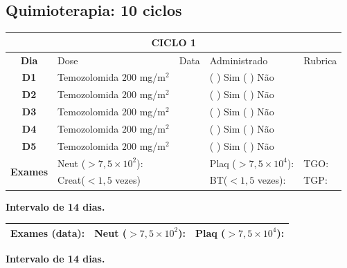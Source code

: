 \documentclass[11pt,a4paper,oldfontcommands]{memoir}
\begin{document}
\subsection{Quimioterapia: 10 ciclos}
\begin{center}
\begin{longtable}{p{1cm}p{4cm}|p{1cm}|p{4.6cm}|p{3cm}}
	\hline
	\multicolumn{5}{c}{\textbf{CICLO 1}}\\
\hline
    \multicolumn{1}{c|}{\multirow{1}{*}{\textbf{Dia}}}&{Dose}&{Data}&{Administrado}&{Rubrica} \\
    \hline
    \multicolumn{1}{c|}{\multirow{1}{*}{\textbf{D1}}}&{Temozolomida \(200\) mg/m\(^2\)}&&{(  ) Sim (  ) Não}&\\
    \multicolumn{1}{c|}{\multirow{1}{*}{\textbf{D2}}}&{Temozolomida \(200\) mg/m\(^2\)}&&{(  ) Sim (  ) Não}&\\
    \multicolumn{1}{c|}{\multirow{1}{*}{\textbf{D3}}}&{Temozolomida \(200\) mg/m\(^2\)}&&{(  ) Sim (  ) Não}&\\
    \multicolumn{1}{c|}{\multirow{1}{*}{\textbf{D4}}}&{Temozolomida \(200\) mg/m\(^2\)}&&{(  ) Sim (  ) Não}&\\
    \multicolumn{1}{c|}{\multirow{1}{*}{\textbf{D5}}}&{Temozolomida \(200\) mg/m\(^2\)}&&{(  ) Sim (  ) Não}&\\
    \hline
    \multicolumn{1}{c|}{\multirow{2}{*}{\textbf{Exames}}}&\multicolumn{2}{l|}{Neut (\(>7,5\times10^2\)):}&{Plaq (\(>7,5\times10^4\)):}&{TGO:}\\
    \cline{2-5}
    \multicolumn{1}{c|}{\multirow{2}{*}{{}}}&\multicolumn{2}{l|}{Creat(\(<1,5\) vezes)}&{BT(\(<1,5\) vezes):}&{TGP:}
    \\
    \hline
\end{longtable}
\textbf{Intervalo de 14 dias.}
\\
\begin{longtable}{p{5cm}|p{5cm}|p{4.5cm}}
    \hline
    \textbf{Exames (data):}&{Neut (\(>7,5\times10^2\)):}&{Plaq (\(>7,5\times10^4\)):}\\
    \hline
\end{longtable}
\textbf{Intervalo de 14 dias.}
\\
\end{center}
\end{document}
